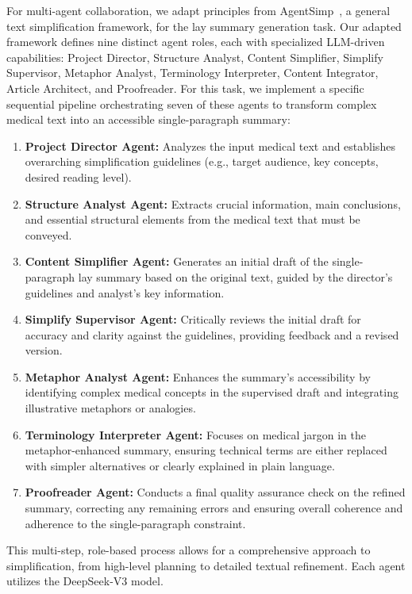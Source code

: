 \documentclass{article}
\begin{document}
For multi-agent collaboration, we adapt principles from AgentSimp~\cite{fang2025AgentSimp}, a general text simplification framework, for the lay summary generation task. Our adapted framework defines nine distinct agent roles, each with specialized LLM-driven capabilities: Project Director, Structure Analyst, Content Simplifier, Simplify Supervisor, Metaphor Analyst, Terminology Interpreter, Content Integrator, Article Architect, and Proofreader. For this task, we implement a specific sequential pipeline orchestrating seven of these agents to transform complex medical text into an accessible single-paragraph summary:
\begin{enumerate}
    \item \textbf{Project Director Agent:} Analyzes the input medical text and establishes overarching simplification guidelines (e.g., target audience, key concepts, desired reading level).
    \item \textbf{Structure Analyst Agent:} Extracts crucial information, main conclusions, and essential structural elements from the medical text that must be conveyed.
    \item \textbf{Content Simplifier Agent:} Generates an initial draft of the single-paragraph lay summary based on the original text, guided by the director's guidelines and analyst's key information.
    \item \textbf{Simplify Supervisor Agent:} Critically reviews the initial draft for accuracy and clarity against the guidelines, providing feedback and a revised version.
    \item \textbf{Metaphor Analyst Agent:} Enhances the summary's accessibility by identifying complex medical concepts in the supervised draft and integrating illustrative metaphors or analogies.
    \item \textbf{Terminology Interpreter Agent:} Focuses on medical jargon in the metaphor-enhanced summary, ensuring technical terms are either replaced with simpler alternatives or clearly explained in plain language.
    \item \textbf{Proofreader Agent:} Conducts a final quality assurance check on the refined summary, correcting any remaining errors and ensuring overall coherence and adherence to the single-paragraph constraint.
\end{enumerate}
This multi-step, role-based process allows for a comprehensive approach to simplification, from high-level planning to detailed textual refinement. Each agent utilizes the DeepSeek-V3 model.
\end{document}
